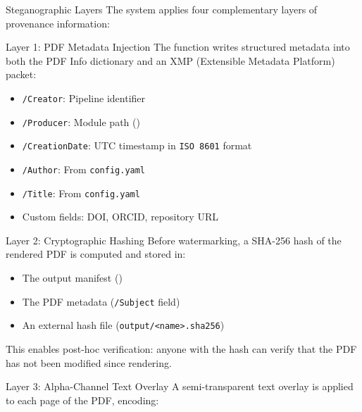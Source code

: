 \documentclass[
  ignorenonframetext,
]{beamer}
\providecommand{\tightlist}{%
  \setlength{\itemsep}{0pt}\setlength{\parskip}{0pt}}
\begin{document}
\begin{frame}{Steganographic Layers}
\protect{}\label{steganographic-layers}
The system applies four complementary layers of provenance information:

\begin{block}{Layer 1: PDF Metadata Injection}
\protect{}\label{layer-1-pdf-metadata-injection}
The  function writes structured metadata
into both the PDF Info dictionary and an XMP (Extensible Metadata
Platform) packet:

\begin{itemize}
\tightlist
\item
  \texttt{/Creator}: Pipeline identifier
\item
  \texttt{/Producer}: Module path
  ()
\item
  \texttt{/CreationDate}: UTC timestamp in \texttt{ISO\ 8601} format
\item
  \texttt{/Author}: From \texttt{config.yaml}
\item
  \texttt{/Title}: From \texttt{config.yaml}
\item
  Custom fields: DOI, ORCID, repository URL
\end{itemize}
\end{block}

\begin{block}{Layer 2: Cryptographic Hashing}
\protect{}\label{layer-2-cryptographic-hashing}
Before watermarking, a SHA-256 hash of the rendered PDF is computed and
stored in:

\begin{itemize}
\tightlist
\item
  The output manifest ()
\item
  The PDF metadata (\texttt{/Subject} field)
\item
  An external hash file
  (\texttt{output/\textless{}name\textgreater{}.sha256})
\end{itemize}

This enables post-hoc verification: anyone with the hash can verify that
the PDF has not been modified since rendering.
\end{block}

\begin{block}{Layer 3: Alpha-Channel Text Overlay}
\protect{}\label{layer-3-alpha-channel-text-overlay}
A semi-transparent text overlay is applied to each page of the PDF,
encoding:


\end{block}
\end{frame}
\end{document}
